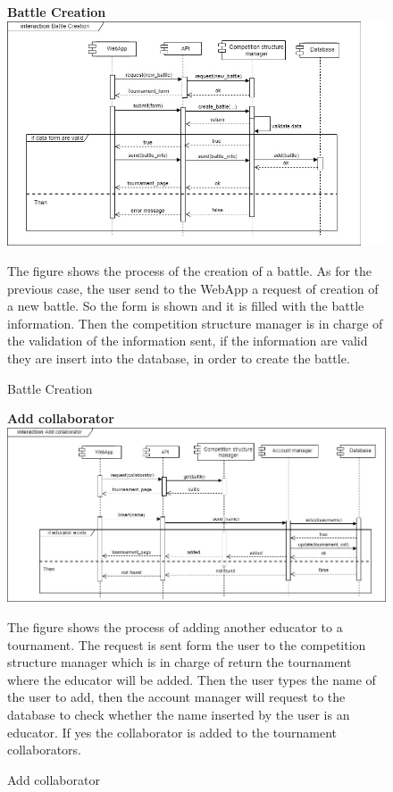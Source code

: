 \begin{enumerate}[label=\textbf{[UC\arabic*]}]
    \begin{figure}
    \item \textbf{Battle Creation}
        \centering
        \includegraphics[width= \textwidth]{Images/Battle_creation.jpg}
        \caption{Battle Creation}
        \label{fig:enter-label}
        \raggedright The figure shows the process of the creation of a battle. As for the previous case, the user send to the WebApp  a request of creation of a new battle. So the form is shown and it is filled with the battle information. Then the competition structure manager is in charge of the validation of the information sent, if the information are valid they are insert into the database, in order to create the battle.
    \end{figure}
    
    \begin{figure}
    \item \textbf{Add collaborator}
        \centering
        \includegraphics[width= \textwidth]{Images/Add_collaborator.jpg}
        \caption{Add collaborator}
        \label{fig:enter-label}
        \raggedright The figure shows the process of adding another educator to a tournament. The request is sent form the user to the competition structure manager which is in charge of return the tournament where the educator will be added.
        Then the user types the name of the user to add, then the account manager will request to the database to check whether the name inserted by the user is an educator. If yes the collaborator is added to the tournament collaborators.
    \end{figure}
    

\end{enumerate}
